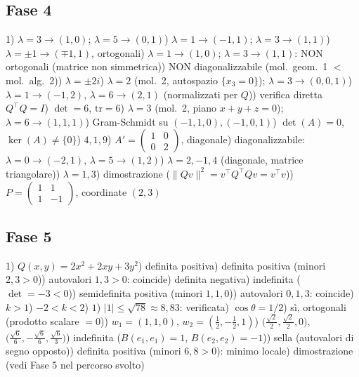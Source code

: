 \documentclass[a4paper,11pt]{article}
\begin{document}
\subsection*{Fase 4}
\footnotesize
1) $\lambda=3\to(1,0)$; $\lambda=5\to(0,1)$) $\lambda=1\to(-1,1)$; $\lambda=3\to(1,1)$) $\lambda=\pm1\to(\mp1,1)$, ortogonali) $\lambda=1\to(1,0)$; $\lambda=3\to(1,1)$: NON ortogonali (matrice non simmetrica)) NON diagonalizzabile (mol.\ geom.\ 1 $<$ mol.\ alg.\ 2)) $\lambda=\pm2i$) $\lambda=2$ (mol.\ 2, autospazio $\{x_3=0\}$); $\lambda=3\to(0,0,1)$) $\lambda=1\to(-1,2)$, $\lambda=6\to(2,1)$ (normalizzati per $Q$)) verifica diretta $Q^\top Q=I$) $\det=6$, $\mathrm{tr}=6$) $\lambda=3$ (mol.\ 2, piano $x+y+z=0$); $\lambda=6\to(1,1,1)$) Gram-Schmidt su $(-1,1,0),(-1,0,1)$) $\det(A)=0$, $\ker(A)\neq\{0\}$) $4,1,9$) $A'=\begin{pmatrix}1&0\\0&2\end{pmatrix}$, diagonale) diagonalizzabile: $\lambda=0\to(-2,1)$, $\lambda=5\to(1,2)$) $\lambda=2,-1,4$ (diagonale, matrice triangolare)) $\lambda=1,3$) dimostrazione ($\|Qv\|^2=v^\top Q^\top Qv=v^\top v$)) $P=\begin{pmatrix}1&1\\1&-1\end{pmatrix}$, coordinate $(2,3)$
\normalsize

\subsection*{Fase 5}
\footnotesize
1) $Q(x,y)=2x^2+2xy+3y^2$) definita positiva) definita positiva (minori $2,3>0$)) autovalori $1,3>0$: coincide) definita negativa) indefinita ($\det=-3<0$)) semidefinita positiva (minori $1,1,0$)) autovalori $0,1,3$: coincide) $k>1$) $-2<k<2$) $1$) $|1|\le\sqrt{78}\approx8{,}83$: verificata) $\cos\theta=1/2$) sì, ortogonali (prodotto scalare $=0$)) $w_1=(1,1,0)$, $w_2=(\tfrac12,-\tfrac12,1)$) $\big(\tfrac{\sqrt2}{2},\tfrac{\sqrt2}{2},0\big)$, $\big(\tfrac{\sqrt6}{6},-\tfrac{\sqrt6}{6},\tfrac{\sqrt6}{3}\big)$) indefinita ($B(e_1,e_1)=1$, $B(e_2,e_2)=-1$)) sella (autovalori di segno opposto)) definita positiva (minori $6,8>0$): minimo locale) dimostrazione (vedi Fase 5 nel percorso svolto)
\normalsize
\end{document}
